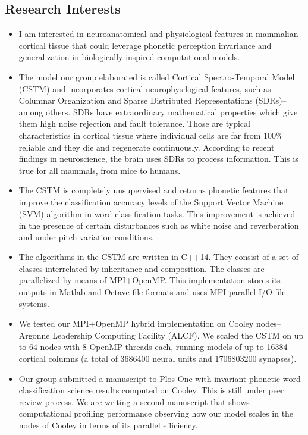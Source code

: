 \documentclass{article}
\begin{document}
\subsection*{Research Interests}
\begin{itemize}
	\item I am interested in neuroanatomical and physiological features in mammalian cortical tissue that could leverage phonetic perception invariance and generalization in biologically inspired computational models.

	\item The model our group elaborated is called Cortical Spectro-Temporal Model (CSTM) and incorporates cortical neurophysilogical features, such as Columnar Organization and Sparse Distributed Representations (SDRs)--among others. SDRs have extraordinary mathematical properties which give them high noise rejection and fault tolerance. Those are typical characteristics in cortical tissue where individual cells are far from 100\% reliable and they die and regenerate continuously. According to recent findings in neuroscience, the brain uses SDRs to process information. This is true for all mammals, from mice to humans.

	\item The CSTM is completely unsupervised and returns phonetic features that improve the classification accuracy levels of the Support Vector Machine (SVM) algorithm in word classification tasks. This improvement is achieved in the presence of certain disturbances such as white noise and reverberation and under pitch variation conditions.

	\item The algorithms in the CSTM are written in C++14. They consist of a set of classes interrelated by inheritance and composition. The classes are parallelized by means of MPI+OpenMP. This implementation stores its outputs in Matlab and Octave file formats and uses MPI parallel I/O file systems.

	\item We tested our MPI+OpenMP hybrid implementation on Cooley nodes--Argonne Leadership Computing Facility (ALCF). We scaled the CSTM on up to 64 nodes with 8 OpenMP threads each, running models of up to 16384 cortical columns (a total of 3686400 neural units and 1706803200 synapses).

	\item Our group submitted a manuscript to Plos One with invariant phonetic word classification science results computed on Cooley. This is still under peer review process. We are writing a second manuscript that shows computational profiling performance observing how our model scales in the nodes of Cooley in terms of its parallel efficiency.
\end{itemize}
\end{document}
